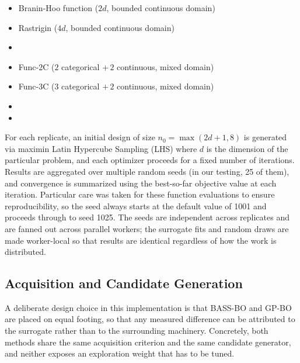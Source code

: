 \begin{itemize}
	\item Branin-Hoo function ($2d$, bounded continuous domain)
	\item Rastrigin ($4d$, bounded continuous domain)
	\item {}
	\item Func-2C ($2$ categorical $+\,2$ continuous, mixed domain)
	\item Func-3C ($3$ categorical $+\,2$ continuous, mixed domain)
	\item {}
	\item {}
\end{itemize}

 For each replicate, an initial design of size $n_0=\max(2d+1,8)$ is generated via maximin Latin Hypercube Sampling (LHS) where $d$ is the dimension of the particular problem, and each optimizer proceeds for a fixed number of iterations. Results are aggregated over multiple random seeds (in our testing, 25 of them), and convergence is summarized using the best-so-far objective value at each iteration. Particular care was taken for these function evaluations to ensure reproducibility, so the seed always starts at the default value of 1001 and proceeds through to seed 1025. The seeds are independent across replicates and are fanned out across parallel workers; the surrogate fits and random draws are made worker-local so that results are identical regardless of how the work is distributed.

\subsection{Acquisition and Candidate Generation}

A deliberate design choice in this implementation is that BASS-BO and GP-BO are placed on equal footing, so that any measured difference can be attributed to the surrogate rather than to the surrounding machinery. Concretely, both methods share the same acquisition criterion and the same candidate generator, and neither exposes an exploration weight that has to be tuned.

